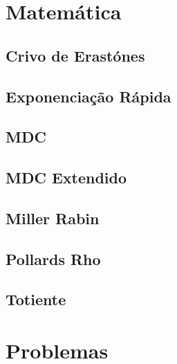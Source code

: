\documentclass[12pt, a4paper, twoside]{article}
\begin{document}
\section{Matemática}

\subsection{Crivo de Erastónes}


\newpage

\subsection{Exponenciação Rápida}


\newpage

\subsection{MDC}


\newpage

\subsection{MDC Extendido}


\newpage

\subsection{Miller Rabin}


\newpage

\subsection{Pollards Rho}


\newpage

\subsection{Totiente}


\newpage

%
%

\section{Problemas}
\end{document}
